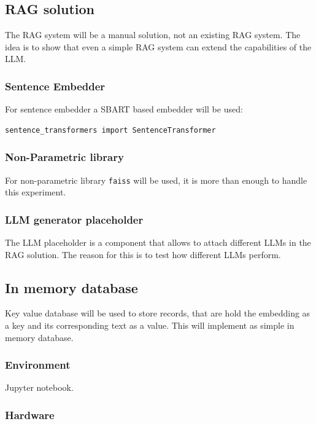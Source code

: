 \documentclass{wseas}
\begin{document}
\newpage

\subsection{RAG solution}

The RAG system will be a manual solution, not an existing RAG system.
The idea is to show that even a simple RAG system can extend the
capabilities of the LLM.

\subsubsection{Sentence Embedder}

For sentence embedder a SBART based embedder will be used:

\begin{verbatim}
sentence_transformers import SentenceTransformer
\end{verbatim}

\subsubsection{Non-Parametric library}

For non-parametric library \texttt{faiss} will be used, it is more than
enough to handle this experiment.

\subsubsection{LLM generator placeholder}

The LLM placeholder is a component that allows to attach different LLMs in the
RAG solution. The reason for this is to test how different LLMs perform.

\subsection{In memory database}
Key value database will be used to store records, that are hold the embedding as a key
and its corresponding text as a value. This will implement as simple in memory database.
\subsubsection{Environment}

Jupyter notebook.

\subsubsection{Hardware}
\end{document}
